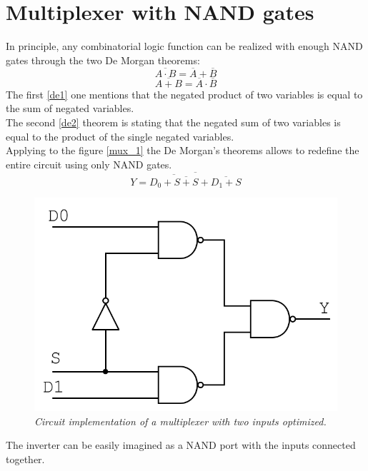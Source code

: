 \section{Multiplexer with NAND gates}
In principle, any combinatorial logic function can be realized with enough NAND gates through the two De Morgan theorems:
\begin{equation}
\overline{A\cdot B}= \overline{A} + \overline{B}
\label{de1}
\end{equation}
\begin{equation}
\overline{A + B}= \overline{A} \cdot \overline{B}
\label{de2}
\end{equation}
The first \ref{de1} one mentions that the negated product of two variables is equal to the sum of negated variables.\\
The second \ref{de2} theorem is stating that the negated sum of two variables is equal to the product of the single negated variables.\\
Applying to the figure \ref{mux_1} the De Morgan's theorems allows to redefine the entire circuit using only NAND gates.
\begin{equation}
Y=\overline{\overline{D_0 + \overline{S + S}}+\overline{D_1+S}}
\label{de3}
\end{equation}
\begin{figure}[!h]
	\centering
	\includegraphics[scale=0.5]{immagini/mux_3.png}
	\caption{\textit{Circuit implementation of a multiplexer with two inputs optimized.}} 
	\label{mux_2}
\end{figure}
\newline
The inverter can be easily imagined as a NAND port with the inputs connected together.
